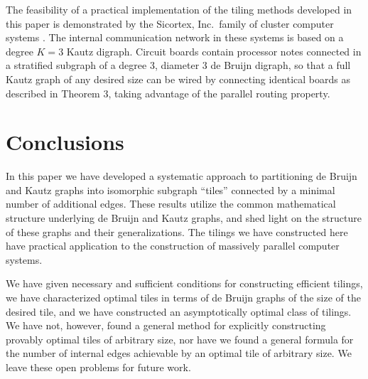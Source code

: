 \documentclass[12pt]{article}
\begin{document}
The feasibility of a practical implementation of the tiling methods
developed in this paper is demonstrated by the Sicortex, Inc.\ family
of cluster computer systems \cite{sc-reference}.  The internal
communication network in these systems is based on a degree $K = 3$
Kautz digraph.  Circuit boards contain processor notes connected in a
stratified subgraph of a degree 3, diameter 3 de Bruijn digraph, so
that a full Kautz graph of any desired size can be wired by connecting
identical boards as described in Theorem 3, taking  
advantage of the parallel routing property.

\section{Conclusions}

In this paper we have developed a systematic approach to partitioning
de Bruijn and Kautz graphs into isomorphic subgraph  ``tiles''
connected by a minimal number of additional edges.  These results
utilize the common mathematical structure underlying de Bruijn and
Kautz graphs, and shed light on the structure of these graphs and
their generalizations.  The tilings we have constructed here have
practical application to the construction of massively parallel
computer systems.

We have given necessary and sufficient conditions for
constructing efficient tilings, we have characterized optimal
tiles in terms of de Bruijn graphs of the size of the desired tile,
and we have constructed an asymptotically optimal class of tilings.
We
have not, however, found a general method for explicitly constructing provably
optimal tiles of arbitrary size, nor have we found a general formula
for the number of internal edges achievable by an optimal tile of
arbitrary size.  We leave these open problems for future work.

\newpage



\end{document}

